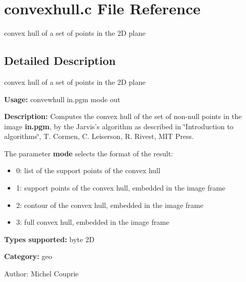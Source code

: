 \section{convexhull.c File Reference}
\label{convexhull_8c}
convex hull of a set of points in the 2D plane 



\subsection{Detailed Description}
convex hull of a set of points in the 2D plane 

{\bf Usage:} convewhull in.pgm mode out

{\bf Description:} Computes the convex hull of the set of non-null points in the image {\bf in.pgm}, by the Jarvis's algorithm as described in \char`\"{}Introduction to algorithms\char`\"{}, T. Cormen, C. Leiserson, R. Rivest, MIT Press.

The parameter {\bf mode} selects the format of the result: \begin{itemize}
\item 0: list of the support points of the convex hull \item 1: support points of the convex hull, embedded in the image frame \item 2: contour of the convex hull, embedded in the image frame \item 3: full convex hull, embedded in the image frame\end{itemize}
{\bf Types supported:} byte 2D

{\bf Category:} geo

\begin{Desc}
\item[Author:]Michel Couprie \end{Desc}
